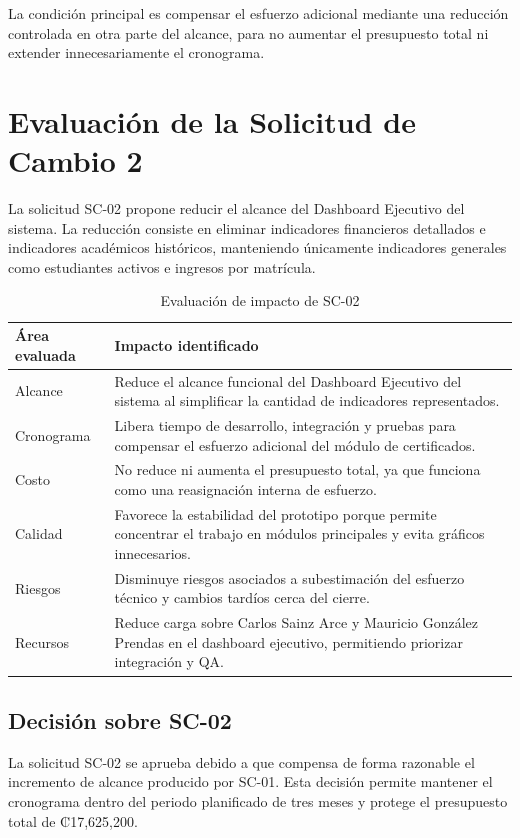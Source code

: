 \documentclass[11pt,spanish]{article}
\begin{document}
La condición principal es compensar el esfuerzo adicional mediante una reducción controlada en otra parte del alcance, para no aumentar el presupuesto total ni extender innecesariamente el cronograma.

\section{Evaluación de la Solicitud de Cambio 2}

La solicitud SC-02 propone reducir el alcance del Dashboard Ejecutivo del sistema. La reducción consiste en eliminar indicadores financieros detallados e indicadores académicos históricos, manteniendo únicamente indicadores generales como estudiantes activos e ingresos por matrícula.

\begin{table}[H]
\centering
\caption{Evaluación de impacto de SC-02}
\label{tab:evaluacion-sc02}
{\small
\begin{tabularx}{\textwidth}{p{3.2cm} Y}
\toprule
\textbf{Área evaluada} & \textbf{Impacto identificado} \\
\midrule
Alcance & Reduce el alcance funcional del Dashboard Ejecutivo del sistema al simplificar la cantidad de indicadores representados. \\
Cronograma & Libera tiempo de desarrollo, integración y pruebas para compensar el esfuerzo adicional del módulo de certificados. \\
Costo & No reduce ni aumenta el presupuesto total, ya que funciona como una reasignación interna de esfuerzo. \\
Calidad & Favorece la estabilidad del prototipo porque permite concentrar el trabajo en módulos principales y evita gráficos innecesarios. \\
Riesgos & Disminuye riesgos asociados a subestimación del esfuerzo técnico y cambios tardíos cerca del cierre. \\
Recursos & Reduce carga sobre Carlos Sainz Arce y Mauricio González Prendas en el dashboard ejecutivo, permitiendo priorizar integración y QA. \\
\bottomrule
\end{tabularx}
}
\end{table}

\subsection{Decisión sobre SC-02}

La solicitud SC-02 se aprueba debido a que compensa de forma razonable el incremento de alcance producido por SC-01. Esta decisión permite mantener el cronograma dentro del periodo planificado de tres meses y protege el presupuesto total de ₡17,625,200.
\end{document}
